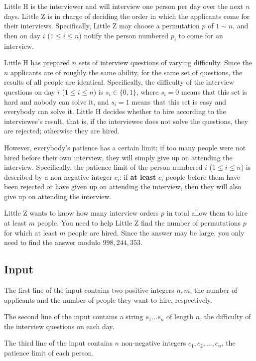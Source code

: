 \documentclass[11pt]{article}
\begin{document}
Little H is the interviewer and will interview one person per day over the
next $n$ days.
Little Z is in charge of deciding the order in which the applicants come
for their interviews.
Specifically, Little Z may choose a permutation $p$ of $1 \sim n$, and then
on day $i$ ($1 \le i \le n$) notify the person numbered $p_i$ to come for
an interview.

Little H has prepared $n$ sets of interview questions of varying difficulty.
Since the $n$ applicants are of roughly the same ability, for the same set
of questions, the results of all people are identical.
Specifically, the difficulty of the interview questions on day $i$
($1 \le i \le n$) is $s_i \in \{0, 1\}$, where $s_i = 0$ means that this
set is hard and nobody can solve it, and $s_i = 1$ means that this set is
easy and everybody can solve it.
Little H decides whether to hire according to the interviewee's result,
that is, if the interviewee does not solve the questions, they are
rejected; otherwise they are hired.

However, everybody's patience has a certain limit; if too many people were
not hired before their own interview, they will simply give up on attending
the interview.
Specifically, the patience limit of the person numbered $i$
($1 \le i \le n$) is described by a non-negative integer $c_i$:
if \textbf{at least} $c_i$ people before them have been rejected or have
given up on attending the interview, then they will also give up on
attending the interview.

Little Z wants to know how many interview orders $p$ in total allow them to
hire at least $m$ people.
You need to help Little Z find the number of permutations $p$ for which at
least $m$ people are hired.
Since the answer may be large, you only need to find the answer modulo
$998{,}244{,}353$.

\subsection*{Input}

The first line of the input contains two positive integers $n, m$, the
number of applicants and the number of people they want to hire,
respectively.

The second line of the input contains a string $s_1 \dots s_n$ of length
$n$, the difficulty of the interview questions on each day.

The third line of the input contains $n$ non-negative integers
$c_1, c_2, \dots, c_n$, the patience limit of each person.
\end{document}
